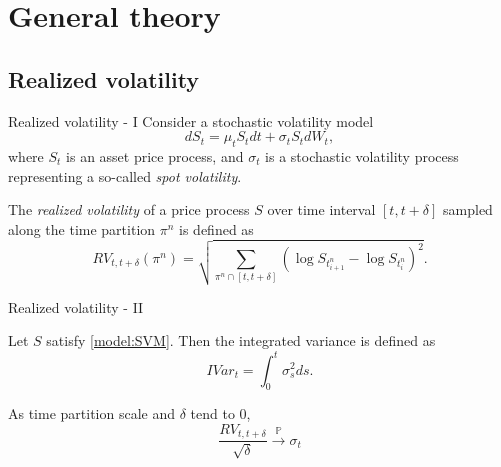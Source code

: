 


    \maketitle

    \section{General theory}
        \subsection{Realized volatility}
            \begin{frame}{Realized volatility - I}
                Consider a stochastic volatility model 
                \begin{equation}\label{model:SVM}
                    dS_t = \mu_t S_t dt + \sigma_t S_tdW_t,
                \end{equation}
                where $S_t$ is an asset price process, and $\sigma_t$ is a stochastic volatility process representing a so-called \emph{spot volatility}.
                \begin{definition}
                    The \emph{realized volatility} of a price process $S$ over time interval $[t, t + \delta]$ sampled along the time partition $\pi^n$
                    is defined as 
                    \begin{equation}\label{def:RV}
                        RV_{t, t + \delta}(\pi^n) = \sqrt{\sum_{\pi^n \cap [t, t + \delta]} \left(\log S_{t^n_{i+1}} - \log S_{t^n_{i}}\right)^2}.
                    \end{equation}
                \end{definition}
            \end{frame}

            \begin{frame}{Realized volatility - II}
                \begin{definition}
                    Let $S$ satisfy \eqref{model:SVM}. Then the integrated variance is defined as
                    \begin{equation}\label{def:IV}
                        IVar_t = \int_{0}^{t} \sigma_s^2 ds.
                    \end{equation}
                \end{definition}

                \begin{theorem} 
                    As time partition scale and $\delta$ tend to $0$, \begin{equation}
                        \frac{RV_{t, t + \delta}}{\sqrt{\delta}} \overset{\mathbb{P}}{\to} \sigma_t
                    \end{equation}
                \end{theorem}
            \end{frame}   

